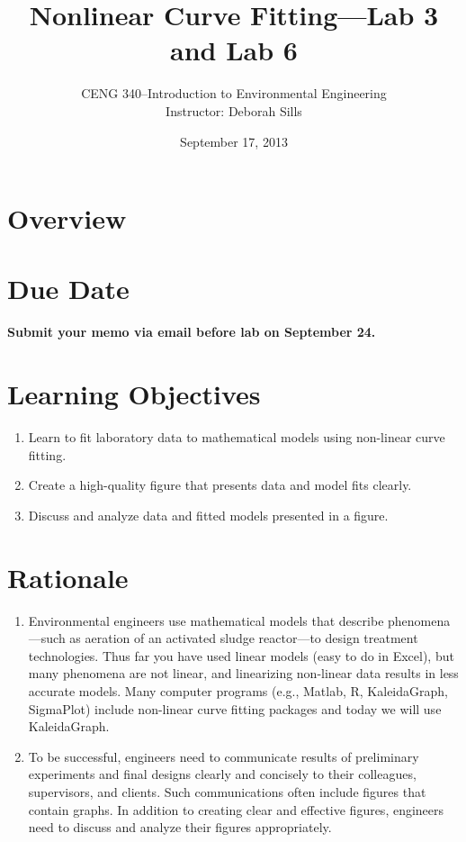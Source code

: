 \documentclass[12pt,letterpaper]{article}
\begin{document}
\setlength{\parindent}{0cm} 


\frenchspacing


\setlength{\topmargin}{-.5in}
\setlength{\textheight}{9in}
\setlength{\oddsidemargin}{.125in}
\setlength{\textwidth}{6.25in}




\title {Nonlinear Curve Fitting---Lab 3 and Lab 6} 
\author {CENG 340--Introduction to Environmental Engineering\\
Instructor: Deborah Sills}
\date {September 17, 2013}
\maketitle


\section*{Overview}




\section *{Due Date}
\textbf{ Submit your memo via email before lab on September 24.} 

\section *{Learning Objectives}
\begin{enumerate}
\item Learn to fit laboratory data to mathematical models using non-linear curve fitting.\
\item Create a high-quality figure that presents data and model fits clearly.\
\item Discuss and analyze data and fitted models presented in a figure.\ 
\end{enumerate}

\section *{Rationale}
\begin{enumerate}
\item Environmental engineers use mathematical models that describe phenomena---such as aeration of an activated sludge reactor---to design treatment technologies.  Thus far you have used linear models (easy to do in Excel), but many phenomena are not linear, and linearizing non-linear data results in less accurate models.  Many computer programs (e.g., Matlab, R, KaleidaGraph, SigmaPlot) include non-linear curve fitting packages and today we will use KaleidaGraph.  
\item To be successful, engineers need to communicate results of preliminary experiments and final designs clearly and concisely to their colleagues, supervisors, and clients.  Such communications often include figures that contain graphs.  In addition to creating clear and effective figures, engineers need to discuss and analyze their figures appropriately. 
\end{enumerate}
 
\end{document}
